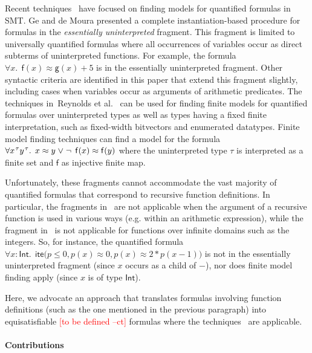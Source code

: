 \documentclass[runningheads,a4paper]{llncs}
\newcommand{\con}[1]{\mathsf{#1}}
\let\oldneg=\neg
\def\neg{\oldneg\:}
\let\oldvee=\vee
\def\vee{\mathrel{\oldvee}}
\newcommand{\teq}{\approx}
\newcommand{\sortint}{\ty{Int}}
\newcommand\ty[1]{\con{#1}}
\newcommand{\lite}{\con{ite}}
\newcommand{\rem}[1]{\textcolor{red}{[#1]}}
\newcommand{\ct}[1]{\rem{#1 --ct}}
\newcommand{\vthinspace}{\kern+0.083333em}
\newcommand{\typ}[1]{^{\vthinspace #1}}
\begin{document}
Recent techniques~\cite{GeDeM-CAV-09, ReyEtAl-1-RR-13}
have focused on finding models for quantified formulas in SMT.
Ge and de Moura \cite{GeDeM-CAV-09} presented a complete instantiation-based
procedure for formulas in the \emph{essentially uninterpreted} fragment.
This fragment is limited to universally quantified formulas where all
occurrences of variables occur as direct subterms of uninterpreted
functions. For example, the formula $\forall x%
.\;\, \con{f}( x )
\teq \con{g}( x ) + 5$ is in the essentially uninterpreted fragment.
Other syntactic criteria are identified in this paper that extend
this fragment slightly, including cases when variables occur as arguments of
arithmetic predicates. The techniques in~Reynolds et al.\
\cite{ReyEtAl-1-RR-13} can be used for finding finite models for quantified
formulas over uninterpreted types as well as types having a fixed finite
interpretation, such as fixed-width bitvectors and enumerated datatypes.
Finite model finding techniques can
find a model for the formula $\forall x\typ{\tau} y\typ{\tau}.\;\, x \teq
y \vee \neg \con{f}( x ) \teq \con{f}( y )$ where the uninterpreted type $\tau$ is
interpreted as a finite set and $\con{f}$ as injective finite map.

Unfortunately, these fragments cannot accommodate the vast majority of
quantified formulas that correspond to recursive function definitions.
In particular, the fragments in~\cite{GeDeM-CAV-09} are not applicable when the argument of a recursive function is used in various ways (e.g. within an arithmetic expression),
while the fragment in~\cite{ReyEtAl-1-RR-13} is not applicable for functions over infinite domains such as the integers.
So, for instance, the quantified formula $\forall x : {\sortint}.\;\, \lite\bigl( p \leq 0, p( x ) \teq 0, p( x ) \teq 2 * p( x - 1 ) \bigr)$
is not in the essentially uninterpreted fragment (since $x$ occurs as a child of $-$),
nor does finite model finding apply (since $x$ is of type $\sortint$).

Here, we advocate an approach that translates formulas involving function
definitions (such as the one mentioned in the previous paragraph)
into equisatisfiable \ct{to be defined} formulas where the
techniques~\cite{GeDeM-CAV-09, ReyEtAl-1-RR-13} are applicable.

\paragraph{Contributions}
\end{document}
